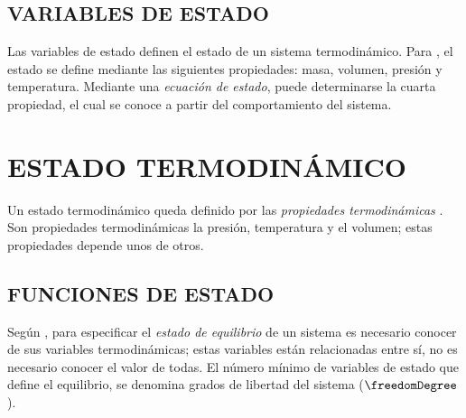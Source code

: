 \subsection{VARIABLES DE ESTADO}
Las variables de estado definen el estado de un sistema termodinámico. Para \parencite{bib:castellan1998fisicoquimica}, el estado se define mediante las siguientes propiedades: masa, volumen, presión y temperatura. Mediante una  \textit{ecuación de estado}, puede determinarse la cuarta propiedad, el cual se conoce a partir del comportamiento del sistema.

\section{ESTADO TERMODINÁMICO}
Un estado termodinámico queda definido por las \textit{propiedades termodinámicas} \parencite[26]{bib:thermo:VanNess}. Son  propiedades termodinámicas la presión, temperatura y el volumen; estas propiedades depende unos de otros.


\subsection{FUNCIONES DE ESTADO}
Según \textcite[p.~40]{bib:sala1997termodinamica}, para especificar el \textit{estado de equilibrio} de un sistema es necesario conocer de sus variables termodinámicas; estas variables están relacionadas entre sí, no es necesario conocer el valor de todas. El número mínimo de variables de estado que define el equilibrio, se denomina grados de libertad del sistema ($\freedomDegree$).



